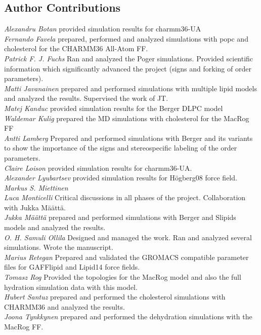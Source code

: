 \documentclass[journal=jacsat,manuscript=article]{achemso}
\begin{document}
\subsection{Author Contributions}
{\it Alexandru Botan} provided simulation results for charmm36-UA\\
{\it Fernando Favela} prepared, performed and analyzed simulations
with popc and cholesterol for the CHARMM36 All-Atom FF. \\
{\it Patrick F. J. Fuchs} Ran and analyzed the Poger simulations. Provided scientific information which significantly advanced the project (signs and forking of order parameters). \\
{\it Matti Javanainen} prepared and performed simulations with multiple lipid models and analyzed the results. Supervised the work of JT.\\
{\it Matej Kanduc} provided simulation results for the Berger DLPC model \\
{\it Waldemar Kulig} prepared the MD simulations with cholesterol for the MacRog FF \\
{\it Antti Lamberg} Prepared and performed simulations with Berger and its variants to show the importance of the signs and stereospecific labeling of the order parameters. \\
{\it Claire Loison} provided simulation results for charmm36-UA. \\
{\it Alexander Lyubartsev} provided simulation results for Högberg08 force field.\\
{\it Markus S. Miettinen}  \\
{\it Luca Monticelli} Critical discussions in all phases of the project. Collaboration with Jukka  M{\"a}{\"a}tt{\"a}. \\
{\it Jukka M{\"a}{\"a}tt{\"a}}  prepared and performed simulations with Berger and Slipids models and analyzed the results.\\
{\it O. H. Samuli Ollila} Designed and managed the work. Ran and analyzed several simulations. Wrote the manuscript.  \\
{\it Marius Retegan} Prepared and validated the GROMACS compatible parameter files for GAFFlipid and Lipid14 force fields.\\
{\it Tomasz Rog} Provided the topologies for the MacRog model and also the full hydration simulation data with this model. \\
{\it Hubert Santuz} prepared and performed the cholesterol simulations with CHARMM36 and analyzed the results. \\
{\it Joona Tynkkynen} prepared and performed the dehydration simulations with the MacRog FF.\\
\end{document}
